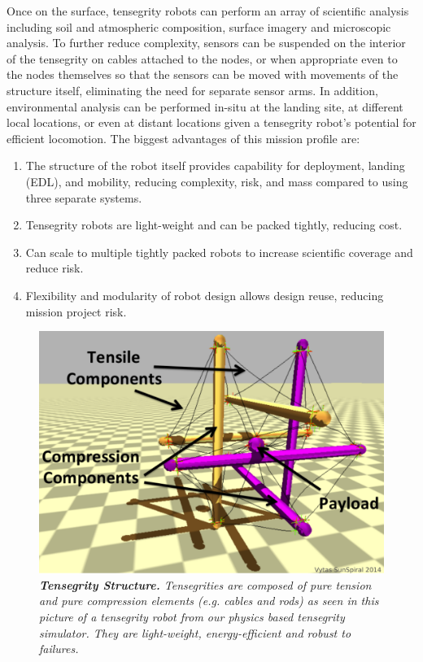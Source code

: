 Once on the surface, tensegrity robots can perform an array of scientific analysis including soil and atmospheric composition, surface imagery and microscopic analysis. To further reduce complexity, sensors can be suspended on the interior of the tensegrity on cables attached to the nodes, or when appropriate even to the nodes themselves so that the sensors can be moved with movements of the structure itself, eliminating the need for separate sensor arms. In addition, environmental analysis can be performed in-situ at the landing site, at different local locations, or even at distant locations given a tensegrity robot's potential for efficient locomotion. The biggest advantages of this mission profile are:
\begin{enumerate}[leftmargin=.5cm]
\item The structure of the robot itself provides capability for deployment, landing (EDL), and mobility, reducing complexity, risk, and mass compared to using three separate systems.
\item Tensegrity robots are light-weight and can be packed tightly, reducing cost.
\item Can scale to multiple tightly packed robots to increase scientific coverage and reduce risk.
\item Flexibility and modularity of robot design allows design reuse, reducing mission project risk.
\end{enumerate}

 \begin{figure}[h]
   \centering
   \includegraphics[width=0.5\columnwidth]{tex/img/fig_basic_diagram}
   \caption{{\em {\bf Tensegrity Structure.} Tensegrities are composed of pure tension and pure compression elements (e.g. cables and rods) as seen in this picture of a tensegrity robot from our physics based tensegrity simulator. They are light-weight, energy-efficient and robust to failures.}}
   \label{fig:basic_diagram1}
\end{figure}

